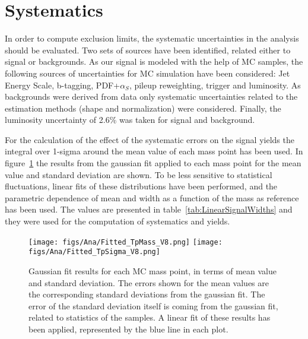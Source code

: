 \section{Systematics}
\label{sec:sys}

In order to compute exclusion limits, the systematic uncertainties in the analysis should be evaluated. Two sets of sources have been identified, related either to signal or backgrounds. As our signal is modeled with the help of MC samples, the following sources of uncertainties for MC simulation have been considered: Jet Energy Scale, b-tagging, PDF+$\alpha_{S}$, pileup reweighting, trigger and luminosity. As backgrounds were derived from data only systematic uncertainties related to the estimation methods (shape and normalization) were considered. Finally, the luminosity uncertainty of 2.6\% was taken for signal and background. 

For the calculation of the effect of the systematic errors on the signal yields the integral over 1-sigma around the mean value of each mass point has been used. In figure~\ref{fig:LinearFitMeanSigma} the results from the gaussian fit applied to each mass point for the mean value and standard deviation are shown. To be less sensitive to statistical fluctuations, linear fits of these distributions have been performed, and the parametric dependence of mean and width as a function of the mass as reference has been used. The values are presented in table~\ref{tab:LinearSignalWidths} and they were used for the computation of systematics and yields.

\begin{figure}[!Hhtbp]
  \begin{center}
    \texttt{[image: figs/Ana/Fitted\_TpMass\_V8.png]}
    \texttt{[image: figs/Ana/Fitted\_TpSigma\_V8.png]}
    \caption{Gaussian fit results for each MC mass point, in terms of mean value and standard deviation. The errors shown for the mean values are the corresponding standard deviations from the gaussian fit. The error of the standard deviation itself is coming from the gaussian fit, related to statistics of the samples. A linear fit of these results has been applied, represented by the blue line in each plot.}
    \label{fig:LinearFitMeanSigma}
  \end{center}
\end{figure}

